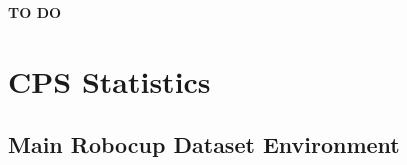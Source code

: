 \documentclass[11pt]{report}
\begin{document}
\textbf{TO DO}
%

\section{CPS Statistics}
\label{app:cps}

\subsection{Main Robocup Dataset Environment}
\label{app:mrd}
\end{document}
